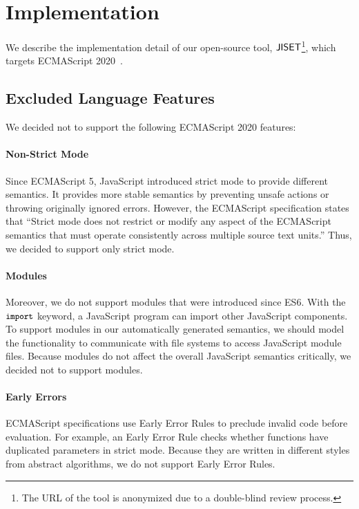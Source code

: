 \section{Implementation}\label{sec:impl}
We describe the implementation detail of our open-source
tool, \( \text{\sf JISET} \)\footnote{The URL of the tool is anonymized due to a
double-blind review process.}, which targets
ECMAScript 2020~\cite{es2020}.


\subsection{Excluded Language Features}\label{sec:exclusion}
We decided not to support the following ECMAScript 2020 features:

\vspace*{-.5em}
\paragraph{Non-Strict Mode}
Since ECMAScript 5, JavaScript introduced strict mode to
provide different semantics.  It
provides more stable semantics by preventing unsafe actions or
throwing originally ignored errors.  However, the ECMAScript
specification states that ``Strict mode does not restrict or modify
any aspect of the ECMAScript semantics that must operate consistently
across multiple source text units.''  Thus, we decided to support only
strict mode.

\vspace*{-.5em}
\paragraph{Modules}
Moreover, we do not support modules that were introduced since ES6.
With the \( \code{import} \) keyword, a JavaScript
program can import other JavaScript components.  To support
modules in our automatically generated semantics, we should model the
functionality to communicate with file systems to access JavaScript
module files.  Because modules do not affect the overall JavaScript
semantics critically, we decided not to support modules.

\vspace*{-.5em}
\paragraph{Early Errors}
ECMAScript specifications use Early Error Rules to preclude invalid code
before evaluation. For example, an Early Error Rule checks whether
functions have duplicated parameters in strict mode.
Because they are written in different styles from abstract algorithms,
we do not support Early Error Rules.

